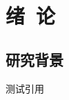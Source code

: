 


\newcommand{\citeA}[1]{\citeauthor{#1}\cite{#1}}

\chapter{绪~论}

\section{研究背景}
\citeA{whitcomb1991}

测试引用\cite{humuyuan2015}\cite{humuyuan2015-2}\cite{hutengyue2014}\cite{whitcomb1991}

\cite{humuyuan2015,humuyuan2015-2,hutengyue2014,whitcomb1991}
